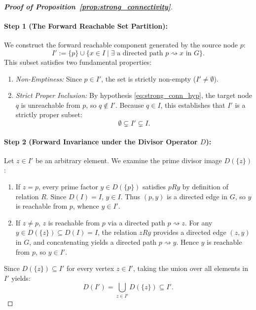 \documentclass[11pt,a4paper]{article}
\theoremstyle{definition}
\begin{document}
\begin{proof}[\textbf{Proof of Proposition~\ref{prop:strong_connectivity}}]
\paragraph{Step 1 (The Forward Reachable Set Partition):}
We construct the forward reachable component generated by the source node $p$:
\begin{equation}
\label{eq:reachable_set_def}
I' := \{p\} \cup \{ x \in I \mid \exists \text{ a directed path } p \rightsquigarrow x \text{ in } G \}.
\end{equation}
This subset satisfies two fundamental properties:
\begin{enumerate}
    \item \emph{Non-Emptiness:} Since $p \in I'$, the set is strictly non-empty ($I' \neq \emptyset$).
    \item \emph{Strict Proper Inclusion:} By hypothesis \eqref{eq:strong_conn_hyp}, the target node $q$ is unreachable from $p$, so $q \notin I'$. Because $q \in I$, this establishes that $I'$ is a strictly proper subset:
    \begin{equation}
    \label{eq:strict_proper_inclusion}
    \emptyset \subsetneq I' \subsetneq I.
    \end{equation}
\end{enumerate}

\paragraph{Step 2 (Forward Invariance under the Divisor Operator $D$):}
Let $z \in I'$ be an arbitrary element. We examine the prime divisor image $D(\{z\})$:
\begin{enumerate}
    \item If $z = p$, every prime factor $y \in D(\{p\})$ satisfies $p R y$ by definition of relation $R$. Since $D(I) = I$, $y \in I$. Thus $(p, y)$ is a directed edge in $G$, so $y$ is reachable from $p$, whence $y \in I'$.
    \item If $z \ne p$, $z$ is reachable from $p$ via a directed path $p \rightsquigarrow z$. For any $y \in D(\{z\}) \subseteq D(I) = I$, the relation $z R y$ provides a directed edge $(z, y)$ in $G$, and concatenating yields a directed path $p \rightsquigarrow y$. Hence $y$ is reachable from $p$, so $y \in I'$.
\end{enumerate}
Since $D(\{z\}) \subseteq I'$ for every vertex $z \in I'$, taking the union over all elements in $I'$ yields:
\begin{equation}
\label{eq:forward_invariance_subisland}
D(I') = \bigcup_{z \in I'} D(\{z\}) \subseteq I'.
\end{equation}


\end{proof}
\end{document}
